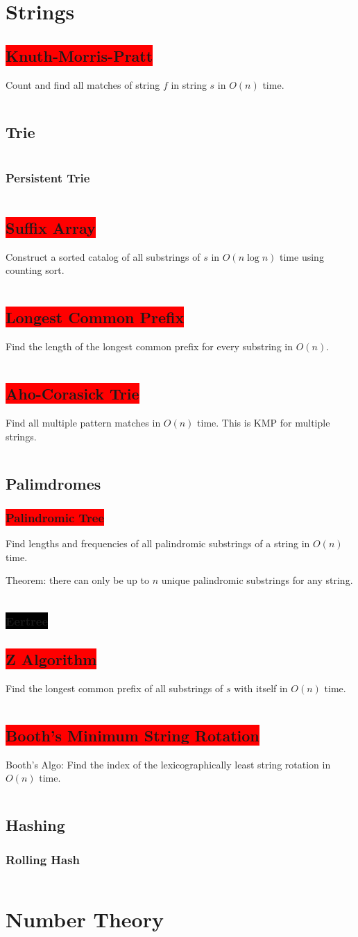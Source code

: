 \documentclass[8pt,a4paper,landscape,oneside]{amsart}
\newcommand{\code}[1]{\inputminted[fontsize=\normalsize,baselinestretch=1]{cpp}{_code/#1}}
\newcommand{\subsectionRed}[1]{\subsection{\colorbox{red}{\color{white}#1}}}
\newcommand{\subsubsectionRed}[1]{\subsubsection{\colorbox{red}{\color{white}#1}}}
\newcommand{\subsubsectionBlack}[1]{\subsubsection{\colorbox{black}{\color{white}#1}}}
\begin{document}
\begin{multicols*}{3}
\section{Strings}
  \subsectionRed{Knuth-Morris-Pratt}
    Count and find all matches of string $f$ in string $s$ in $O(n)$ time.
    \code{strings/kmp.cpp}
  \subsection{Trie}
    \code{strings/trie.cpp}
    \subsubsection{Persistent Trie}
      \code{strings/trie_persistent.cpp}
  \subsectionRed{Suffix Array}
    Construct a sorted catalog of all substrings of $s$ in $O(n \log n)$ time using counting sort.
    \code{strings/suffix-array.cpp}
  \subsectionRed{Longest Common Prefix}
    Find the length of the longest common prefix for every substring in $O(n)$.
    \code{strings/lcp.cpp}
  \subsectionRed{Aho-Corasick Trie}
    Find all multiple pattern matches in $O(n)$ time. This is KMP for multiple strings.
    \code{strings/aho-corasick-trie.java}
  \subsection{Palimdromes}
    \subsubsectionRed{Palindromic Tree}
      Find lengths and frequencies of all palindromic substrings of a string in $O(n)$ time.

      Theorem: there can only be up to $n$ unique palindromic substrings for any string.
      \code{strings/palindromic-tree.cpp}
    \subsubsectionBlack{Eertree}
  \subsectionRed{Z Algorithm}
    Find the longest common prefix of all substrings of $s$ with itself in $O(n)$ time.
    \code{strings/z.cpp}
  \subsectionRed{Booth's Minimum String Rotation}
    Booth's Algo: Find the index of the lexicographically least string rotation in $O(n)$ time.
    \code{strings/booth.cpp}
	\subsection{Hashing}
    \subsubsection{Rolling Hash}
      \code{strings/rolling_hash.cpp}
\section{Number Theory}

\end{multicols*}
\end{document}
